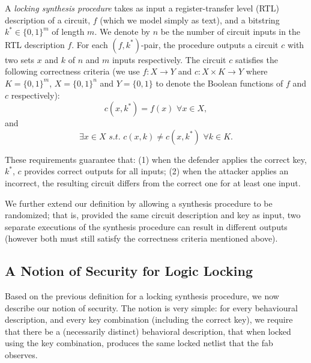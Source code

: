 \begin{definition}
A \emph{locking synthesis procedure} takes as input a register-transfer level (RTL) description of a circuit, $f$ (which we model simply as text), and a bitstring $k^{*} \in \{0,1\}^{m}$ of length $m$. We denote by $n$ be the number of circuit inputs in the RTL description $f$. For each $(f,k^*)$-pair, the procedure outputs a circuit $c$ with two sets $x$ and $k$ of $n$ and $m$ inputs respectively. The circuit $c$  satisfies the following correctness criteria (we use $f: X \rightarrow Y$ and $c: X \times K \rightarrow Y$ where $K = \{0,1\}^{m}$, $X = \{0,1\}^{n}$ and $Y = \{0,1\}$ to denote the Boolean functions of $f$ and $c$ respectively):
$$ c(x,k^{*}) = f(x) \, \, \forall x \in X, $$
and 
$$ \exists  x \in X \,\, s.t. \,\, c(x,k) \neq c(x,k^{*}) \, \, \forall k \in K.$$ 
\end{definition}



These requirements guarantee that: (1) when the defender applies the correct key, $k^{*}$,
$c$ provides correct outputs for all inputs; (2) when the attacker applies an incorrect, the resulting circuit differs from the correct one for at least one input.

We further extend our definition by allowing a synthesis procedure to be randomized; that is, provided the same circuit description and key as input, two separate executions of the synthesis procedure can result in different outputs (however both must still satisfy the correctness criteria mentioned above).

\subsection{A Notion of Security for Logic Locking}
 Based on the previous definition for a locking synthesis procedure, we now describe our notion of security. The notion is very simple: for every behavioural description, and every key combination (including the correct key), we require that there be a (necessarily distinct) behavioral description, that when locked using the key combination, produces the same locked netlist that the fab observes. 
 
